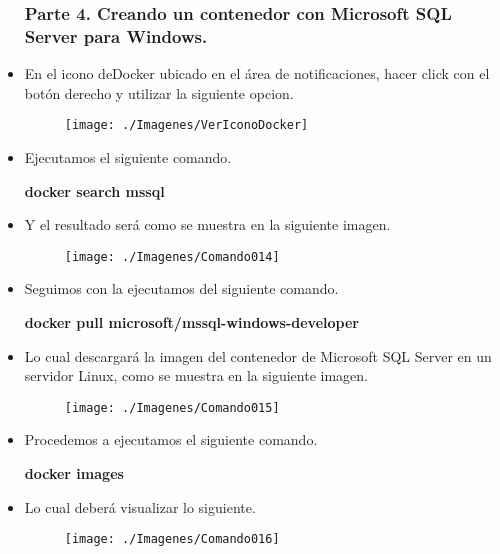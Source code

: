 \begin{itemize}
				\subsubsection{Parte 4. Creando un contenedor con Microsoft SQL Server para Windows.}
					\item En el icono deDocker ubicado en el área de notificaciones, hacer click con el botón derecho y utilizar la siguiente opcion.
						\begin{figure}[htb]
							\begin{center}
								\texttt{[image: ./Imagenes/VerIconoDocker]}
							\end{center}
						\end{figure}
					\item Ejecutamos el siguiente comando.
						\begin{center}
							\textbf{docker search mssql} \\
						\end{center}
					\item Y el resultado será como se muestra en la siguiente imagen.
						\begin{figure}[htb]						
							\begin{center}
								\texttt{[image: ./Imagenes/Comando014]}
							\end{center}
						\end{figure}
						\vspace{6cm}
					\item Seguimos con la ejecutamos del siguiente comando.
						\begin{center}
							\textbf{docker pull microsoft/mssql-windows-developer} \\
						\end{center}
					\item Lo cual descargará la imagen del contenedor de Microsoft SQL Server en un servidor Linux, como se muestra en la siguiente imagen.
						\begin{figure}[htb]						
							\begin{center}
								\texttt{[image: ./Imagenes/Comando015]}
							\end{center}
						\end{figure}
					\item Procedemos a ejecutamos el siguiente comando.
						\begin{center}
							\textbf{docker images} \\
						\end{center}
					\item Lo cual deberá visualizar lo siguiente.
						\begin{figure}[htb]						
							\begin{center}
								\texttt{[image: ./Imagenes/Comando016]}
							\end{center}
						\end{figure}
	\end{itemize}